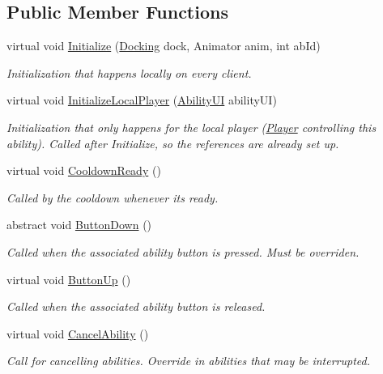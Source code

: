 \subsection*{Public Member Functions}
\begin{DoxyCompactItemize}
\item 
virtual void \hyperlink{class_ability_ae659b58f49f07191c1d269fc3ba59c7e}{Initialize} (\hyperlink{class_docking}{Docking} dock, Animator anim, int ab\+Id)
\begin{DoxyCompactList}\small\item\em Initialization that happens locally on every client. \end{DoxyCompactList}\item 
virtual void \hyperlink{class_ability_ae8217a23a940c9ce450e827856d7020b}{Initialize\+Local\+Player} (\hyperlink{class_ability_u_i}{Ability\+UI} ability\+UI)
\begin{DoxyCompactList}\small\item\em Initialization that only happens for the local player (\hyperlink{class_player}{Player} controlling this ability). Called after Initialize, so the references are already set up. \end{DoxyCompactList}\item 
virtual void \hyperlink{class_ability_af5abb620807086a1752b17b276c76a2e}{Cooldown\+Ready} ()
\begin{DoxyCompactList}\small\item\em Called by the cooldown whenever its ready. \end{DoxyCompactList}\item 
abstract void \hyperlink{class_ability_a7722265862f8b29828315725415ce266}{Button\+Down} ()
\begin{DoxyCompactList}\small\item\em Called when the associated ability button is pressed. Must be overriden. \end{DoxyCompactList}\item 
virtual void \hyperlink{class_ability_ad13b45ac8d2205494b2c12d16677fe26}{Button\+Up} ()
\begin{DoxyCompactList}\small\item\em Called when the associated ability button is released. \end{DoxyCompactList}\item 
virtual void \hyperlink{class_ability_ab0eaf1ad670e0624a5534c50b10c002f}{Cancel\+Ability} ()
\begin{DoxyCompactList}\small\item\em Call for cancelling abilities. Override in abilities that may be interrupted. \end{DoxyCompactList}\item 

\end{DoxyCompactItemize}
